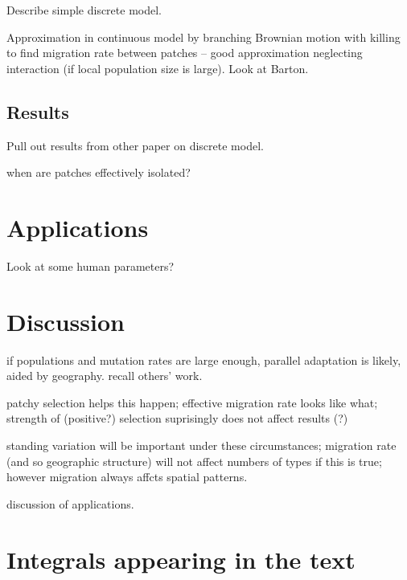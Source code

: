 \documentclass{article}
\begin{document}
Describe simple discrete model. 

Approximation in continuous model by branching Brownian motion with killing to find migration rate between patches -- 
good approximation neglecting interaction (if local population size is large). 
Look at Barton. 

\subsection{Results} 

Pull out results from other paper on discrete model. 

when are patches effectively isolated? 

\section{Applications} 

Look at some human parameters? 

\section{Discussion} 

if populations and mutation rates are large enough, parallel adaptation is likely, aided by geography. 
recall others' work. 

patchy selection helps this happen; 
effective migration rate looks like what; 
strength of (positive?) selection suprisingly does not affect results (?) 

standing variation will be important under these circumstances; 
migration rate (and so geographic structure) will not affect numbers of types if this is true; 
however migration always affcts spatial patterns. 

discussion of applications. 



\appendix

\section{Integrals appearing in the text}
    \label{apx:integrals}
\end{document}
